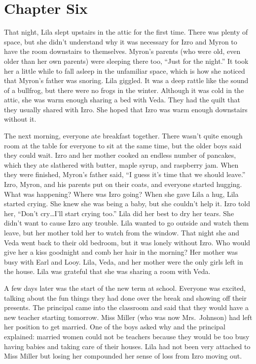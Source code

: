\documentclass[
  american,
  letterpaper,
]{book}
\begin{document}

\chapter{Chapter Six}\label{chapter-six}

That night, Lila slept upstairs in the attic for the first time. There
was plenty of space, but she didn't understand why it was necessary for
Izro and Myron to have the room downstairs to themselves. Myron's
parents (who were old, even older than her own parents) were sleeping
there too, ``Just for the night.'' It took her a little while to fall
asleep in the unfamiliar space, which is how she noticed that Myron's
father was snoring. Lila giggled. It was a deep rattle like the sound of
a bullfrog, but there were no frogs in the winter. Although it was cold
in the attic, she was warm enough sharing a bed with Veda. They had the
quilt that they usually shared with Izro. She hoped that Izro was warm
enough downstairs without it.

The next morning, everyone ate breakfast together. There wasn't quite
enough room at the table for everyone to sit at the same time, but the
older boys said they could wait. Izro and her mother cooked an endless
number of pancakes, which they ate slathered with butter, maple syrup,
and raspberry jam. When they were finished, Myron's father said, ``I
guess it's time that we should leave.'' Izro, Myron, and his parents put
on their coats, and everyone started hugging. What was happening? Where
was Izro going? When she gave Lila a hug, Lila started crying. She knew
she was being a baby, but she couldn't help it. Izro told her, ``Don't
cry\ldots I'll start crying too.'' Lila did her best to dry her tears.
She didn't want to cause Izro any trouble. Lila wanted to go outside and
watch them leave, but her mother told her to watch from the window. That
night she and Veda went back to their old bedroom, but it was lonely
without Izro. Who would give her a kiss goodnight and comb her hair in
the morning? Her mother was busy with Earl and Looy. Lila, Veda, and her
mother were the only girls left in the house. Lila was grateful that she
was sharing a room with Veda.

A few days later was the start of the new term at school. Everyone was
excited, talking about the fun things they had done over the break and
showing off their presents. The principal came into the classroom and
said that they would have a new teacher starting tomorrow. Miss Miller
(who was now Mrs.~Johnson) had left her position to get married. One of
the boys asked why and the principal explained: married women could not
be teachers because they would be too busy having babies and taking care
of their houses. Lila had not been very attached to Miss Miller but
losing her compounded her sense of loss from Izro moving out.
\end{document}

